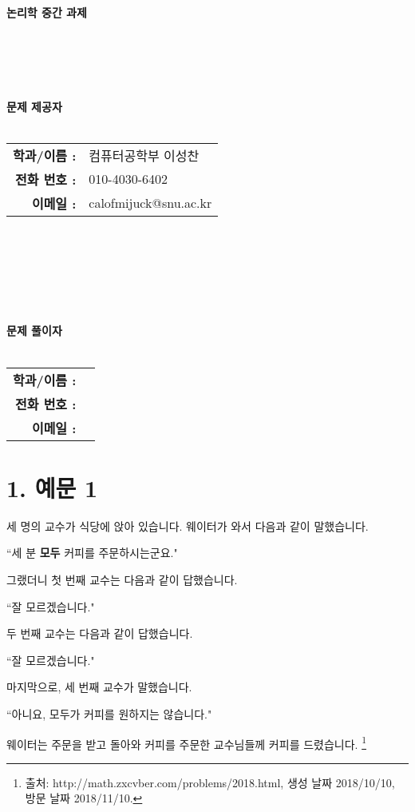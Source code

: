 \documentclass[12pt]{report}
\begin{document}
\begin{center}
	~\\~\\~\\~\\~\\~\\~\\
\textbf{\Huge 논리학 중간 과제}\\~\\~\\~\\~\\~\\
\textbf{\large 문제 제공자} \\~\\
\begin{tabular}{rl}
	\textbf{학과/이름 :}& 컴퓨터공학부 이성찬\\
	\textbf{전화 번호 :}& 010-4030-6402\\
	\textbf{이메일 :}& calofmijuck@snu.ac.kr\\
\end{tabular}
~\\~\\~\\~\\~\\~\\
\textbf{\large 문제 풀이자} \\~\\
\begin{tabular}{rl}
	\textbf{학과/이름 :}& \underline{\qquad\qquad\qquad\qquad\qquad}\\
	\textbf{전화 번호 :}& \underline{\qquad\qquad\qquad\qquad\qquad}\\
	\textbf{이메일 :}& \underline{\qquad\qquad\qquad\qquad\qquad}\\
\end{tabular}

\end{center}
\pagebreak

\section*{1. 예문 1} 
세 명의 교수가 식당에 앉아 있습니다. 웨이터가 와서 다음과 같이 말했습니다.
\begin{center}
	``세 분 \textbf{모두} 커피를 주문하시는군요."
\end{center}
그랬더니 첫 번째 교수는 다음과 같이 답했습니다.
\begin{center} 
	``잘 모르겠습니다."
\end{center}
두 번째 교수는 다음과 같이 답했습니다.
\begin{center} 
	``잘 모르겠습니다."
\end{center}
마지막으로, 세 번째 교수가 말했습니다.
\begin{center} 
	``아니요, 모두가 커피를 원하지는 않습니다."
\end{center}
웨이터는 주문을 받고 돌아와 커피를 주문한 교수님들께 커피를 드렸습니다. \footnote{출처: http://math.zxcvber.com/problems/2018.html, 생성 날짜 2018/10/10, 방문 날짜 2018/11/10.} \\
\pagebreak
\end{document}

